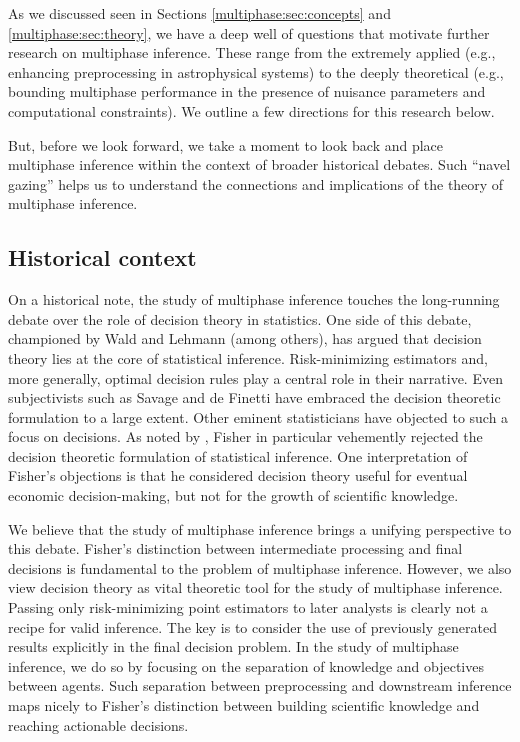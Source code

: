 As we discussed seen in Sections \ref{multiphase:sec:concepts} and \ref{multiphase:sec:theory}, we have a deep well of questions that motivate further research on multiphase inference.
These range from the extremely applied (e.g., enhancing preprocessing in astrophysical systems) to the deeply theoretical (e.g., bounding multiphase performance in the presence of nuisance parameters and computational constraints).
We outline a few directions for this research below.

But, before we look forward, we take a moment to look back and place multiphase inference within the context of broader historical debates.
Such ``navel gazing'' helps us to understand the connections and implications of the theory of multiphase inference.

\subsection{Historical context}

On a historical note, the study of multiphase inference touches the long-running debate over the role of decision theory in statistics.
One side of this debate, championed by Wald and Lehmann (among others), has argued that decision theory lies at the core of statistical inference.
Risk-minimizing estimators and, more generally, optimal decision rules play a central role in their narrative.
Even subjectivists such as Savage and de Finetti have embraced the decision theoretic formulation to a large extent.
Other eminent statisticians have objected to such a focus on decisions.
As noted by \citet{Savage1976}, Fisher in particular vehemently rejected the decision theoretic formulation of statistical inference.
One interpretation of Fisher's objections is that he considered decision theory useful for eventual economic decision-making, but not for the growth of scientific knowledge.
 
We believe that the study of multiphase inference brings a unifying perspective to this debate.
Fisher's distinction between intermediate processing and final decisions is fundamental to the problem of multiphase inference.
However, we also view decision theory as vital theoretic tool for the study of multiphase inference.
Passing only risk-minimizing point estimators to later analysts is clearly not a recipe for valid inference.
The key is to consider the use of previously generated results explicitly in the final decision problem.
In the study of multiphase inference, we do so by focusing on the separation of knowledge and objectives between agents.
Such separation between preprocessing and downstream inference maps nicely to Fisher's distinction between building scientific knowledge and reaching actionable decisions.

